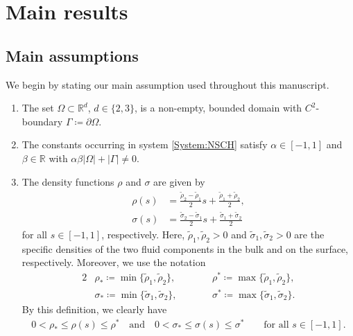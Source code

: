 \documentclass[11pt,reqno]{amsart}
\theoremstyle{remark}
\numberwithin{equation}{section}
\newcommand{\abs}[1]{|#1|}
\newcommand{\R}{\mathbb R}
\newcommand{\Om}{\Omega}
\newcommand{\Ga}{\Gamma}
\begin{document}
\section{Main results}
\label{Section:MainResults}


\subsection{Main assumptions}

We begin by stating our main assumption used throughout this manuscript.

\begin{enumerate}[label=\textnormal{\bfseries(A\arabic*)}]
	\item \label{Assumption:NSCH:1} The set $\Om\subset\R^d$, $d\in\{2,3\}$, is a non-empty, bounded domain with $C^2$-boundary $\Gamma \coloneqq \partial\Omega$.
	\item \label{Assumption:NSCH:2} The constants occurring in system \eqref{System:NSCH} satisfy $\alpha\in[-1,1]$ and $\beta\in\R$ with $\alpha\beta\abs{\Om} + \abs{\Ga}\neq 0$.
    \item \label{Assumption:NSCH:Density} The density functions $\rho$ and $\sigma$ are given by
    \begin{align*}
    	\rho(s) &= \frac{\tilde{\rho}_2 - \tilde{\rho}_1}{2}s + \frac{\tilde{\rho}_1 + \tilde{\rho}_2}{2}, \\
    	\sigma(s) &= \frac{\tilde{\sigma}_2 - \tilde{\sigma}_1}{2}s + \frac{\tilde{\sigma}_1 + \tilde{\sigma}_2}{2}
    \end{align*}
    for all $s\in[-1,1]$, respectively. Here, $\tilde{\rho}_1, \tilde{\rho}_2>0$ and $\tilde{\sigma}_1, \tilde{\sigma}_2>0$ are the specific densities of the two fluid components in the bulk and on the surface, respectively. Moreover, we use the notation
    \begin{alignat*}{2}
        &\rho_\ast \coloneqq \min\{\tilde\rho_1,\tilde\rho_2\}, \qquad 
        &&\rho^\ast \coloneqq \max\{\tilde\rho_1,\tilde\rho_2\},
        \\
        &\sigma_\ast \coloneqq \min\{\tilde\sigma_1,\tilde\sigma_2\}, \qquad 
        &&\sigma^\ast \coloneqq \max\{\tilde\sigma_1,\tilde\sigma_2\}.
    \end{alignat*}
    By this definition, we clearly have
    \begin{align*}
        0 < \rho_\ast \leq \rho(s) \leq \rho^\ast \quad\text{and}\quad 0 < \sigma_\ast \leq \sigma(s) \leq \sigma^\ast \qquad\text{for all~}s\in[-1,1].
    \end{align*}

\end{enumerate}
\end{document}

